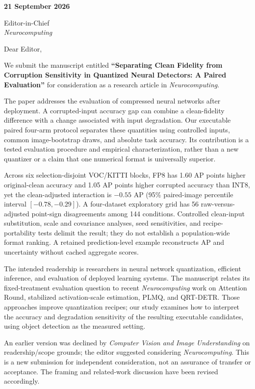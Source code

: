 \documentclass[11pt]{article}
\begin{document}
\thispagestyle{empty}

\textbf{21 September 2026}

Editor-in-Chief\\
\textit{Neurocomputing}

Dear Editor,

We submit the manuscript entitled \textbf{``Separating Clean Fidelity from Corruption Sensitivity in Quantized Neural Detectors: A Paired Evaluation''} for consideration as a research article in \textit{Neurocomputing}.

The paper addresses the evaluation of compressed neural networks after deployment. A corrupted-input accuracy gap can combine a clean-fidelity difference with a change associated with input degradation. Our executable paired four-arm protocol separates these quantities using controlled inputs, common image-bootstrap draws, and absolute task accuracy. Its contribution is a tested evaluation procedure and empirical characterization, rather than a new quantizer or a claim that one numerical format is universally superior.

Across six selection-disjoint VOC/KITTI blocks, FP8 has 1.60 AP points higher original-clean accuracy and 1.05 AP points higher corrupted accuracy than INT8, yet the clean-adjusted interaction is $-0.55$ AP (95\% paired-image percentile interval $[-0.78,-0.29]$). A four-dataset exploratory grid has 56 raw-versus-adjusted point-sign disagreements among 144 conditions. Controlled clean-input substitution, scale and covariance analyses, seed sensitivities, and recipe-portability tests delimit the result; they do not establish a population-wide format ranking. A retained prediction-level example reconstructs AP and uncertainty without cached aggregate scores.

The intended readership is researchers in neural network quantization, efficient inference, and evaluation of deployed learning systems. The manuscript relates its fixed-treatment evaluation question to recent \textit{Neurocomputing} work on Attention Round, stabilized activation-scale estimation, PLMQ, and QRT-DETR. Those approaches improve quantization recipes; our study examines how to interpret the accuracy and degradation sensitivity of the resulting executable candidates, using object detection as the measured setting.

An earlier version was declined by \textit{Computer Vision and Image Understanding} on readership/scope grounds; the editor suggested considering \textit{Neurocomputing}. This is a new submission for independent consideration, not an assurance of transfer or acceptance. The framing and related-work discussion have been revised accordingly.
\end{document}
